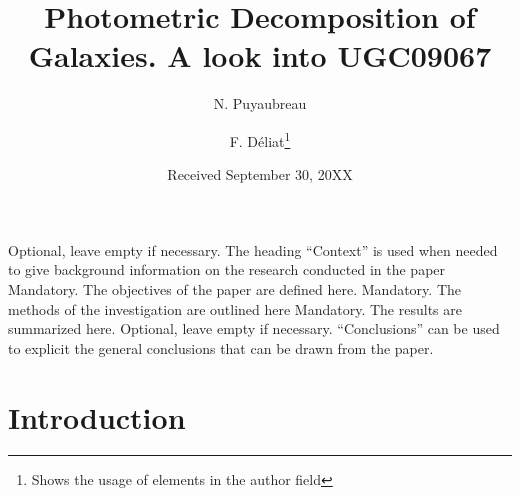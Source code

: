 \documentclass{aa}
\begin{document}
   \title{Photometric Decomposition of Galaxies. A look into UGC09067}


   \author{N. Puyaubreau
        \and F. Déliat\fnmsep\thanks{Shows the usage of elements in the author field}
        }


   \date{Received September 30, 20XX}

 
  \abstract
   {Optional, leave empty if necessary.  The heading “Context” is used when needed to
give background information on the research conducted in the paper}
   {Mandatory. The objectives of the paper are defined here.} 
   {Mandatory. The methods of the investigation are outlined here}
   {Mandatory. The results are summarized here.}
   {Optional, leave empty if necessary.  “Conclusions” can be used to
explicit the general conclusions that can be drawn from the paper.}


   \maketitle


\section{Introduction}
\lipsum[1]
\end{document}
